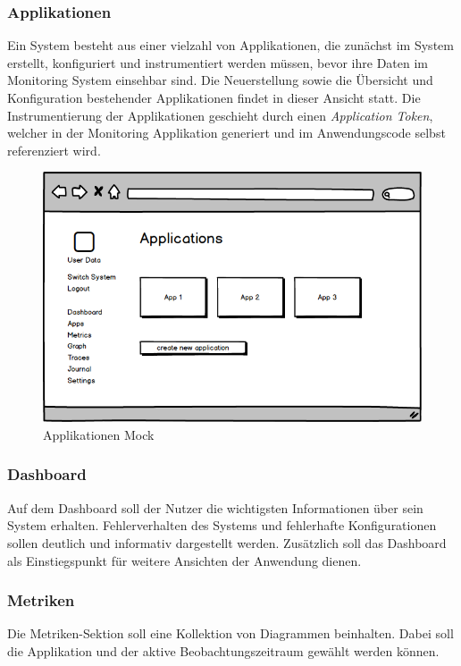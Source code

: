 \subsubsection{Applikationen}

Ein System besteht aus einer vielzahl von Applikationen, die zunächst im System erstellt,
konfiguriert und instrumentiert werden müssen, bevor ihre Daten im Monitoring System einsehbar sind.
Die Neuerstellung sowie die Übersicht und Konfiguration bestehender Applikationen
findet in dieser Ansicht statt. Die Instrumentierung der Applikationen
geschieht durch einen \emph{Application Token}, welcher in der Monitoring
Applikation generiert und im Anwendungscode selbst referenziert wird.


\vspace{0.3cm}

\begin{figure}[h]
 \centering
 \includegraphics[width=0.6\linewidth]{kapitel1/mocks/apps.png}
 \caption{Applikationen Mock}
 \label{fig:apps}
\end{figure}


\subsubsection{Dashboard}

Auf dem Dashboard soll der Nutzer die wichtigsten Informationen über sein System erhalten.
Fehlerverhalten des Systems und fehlerhafte Konfigurationen sollen deutlich und informativ dargestellt werden.
Zusätzlich soll das Dashboard als Einstiegspunkt für weitere Ansichten der Anwendung dienen.

\subsubsection{Metriken}

Die Metriken-Sektion soll eine Kollektion von Diagrammen beinhalten.
Dabei soll die Applikation und der aktive Beobachtungszeitraum gewählt werden können.

